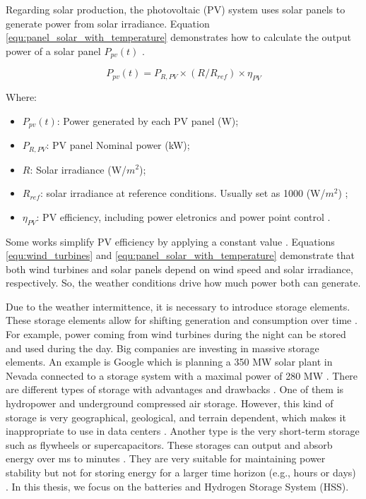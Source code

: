 Regarding solar production, the photovoltaic (PV) system uses solar panels to generate power from solar irradiance. Equation \ref{equ:panel_solar_with_temperature} demonstrates how to calculate the output power of a solar panel $P_{pv}(t)$ \cite{maleki2015optimal, sinha2015review, dong2016optimal}.

\begin{equation}
    \label{equ:panel_solar_with_temperature}
    P_{pv}(t) = P_{R,PV} \times (R / R_{ref}) \times \eta_{PV}
\end{equation}

Where:
\begin{itemize}
    \item $P_{pv}(t)$: Power generated by each PV panel (W);
    \item $P_{R,PV}$: PV panel Nominal power (kW);
    \item $R$: Solar irradiance (W/$m^{2}$);
    \item $R_{ref}$: solar irradiance at reference conditions. Usually set as 1000 (W/$m^{2}$) \cite{dong2016optimal};
    \item $\eta_{PV}$: PV efficiency, including power eletronics and power point control \cite{sinha2015review, maleki2015optimal}.
\end{itemize}

Some works simplify PV efficiency by applying a constant value \cite{dong2016optimal, haddad2019mixed}. Equations \ref{equ:wind_turbines} and \ref{equ:panel_solar_with_temperature} demonstrate that both wind turbines and solar panels depend on wind speed and solar irradiance, respectively. So, the weather conditions drive how much power both can generate. 

Due to the weather intermittence, it is necessary to introduce storage elements. These storage elements allow for shifting generation and consumption over time \cite{rostirolla2022survey}. For example, power coming from wind turbines during the night can be stored and used during the day. Big companies are investing in massive storage elements. An example is Google which is planning a 350 MW solar plant in Nevada connected to a storage system with a maximal power of 280 MW \cite{branscombe2020google}. There are different types of storage with advantages and drawbacks \cite{wang2012energy}. One of them is hydropower and underground compressed air storage. However, this kind of storage is very geographical, geological, and terrain dependent, which makes it inappropriate to use in data centers \cite{rostirolla2022survey}. Another type is the very short-term storage such as flywheels or supercapacitors. These storages can output and absorb energy over ms to minutes \cite{wang2012energy}. They are very suitable for maintaining power stability but not for storing energy for a larger time horizon (e.g., hours or days) \cite{rostirolla2022survey}. In this thesis, we focus on the batteries and Hydrogen Storage System (HSS).

